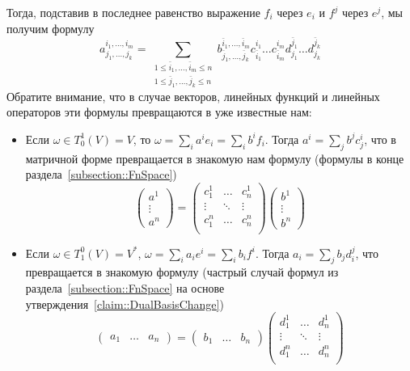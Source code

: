 Тогда, подставив в последнее равенство выражение $f_i$ через $e_i$ и $f^j$ через $e^j$, мы получим формулу
\[
a^{i_1,\ldots,i_m}_{j_1,\ldots,j_k} = \sum_{\substack{1\leqslant \bar i_1,\ldots,\bar i_m\leqslant n\\1\leqslant \bar j_1,\ldots,\bar j_k\leqslant n}} b^{\bar i_1,\ldots,\bar i_m}_{\bar j_1,\ldots,\bar j_k} c^{i_1}_{\bar i_1}\ldots c^{i_m}_{\bar i_m} d^{\bar j_1}_{j_1}\ldots d^{\bar j_k}_{j_k}
\]
Обратите внимание, что в случае векторов, линейных функций и линейных операторов эти формулы превращаются в уже известные нам:
\begin{itemize}

\item Если $\omega\in T^1_0(V) = V$, то $\omega = \sum_i a^i e_i = \sum_i b^i f_i$. Тогда $a^i = \sum_j b^j c^i_j$, что в матричной форме превращается в знакомую нам формулу (формулы в конце раздела~\ref{subsection::FnSpace})
\[
\begin{pmatrix}
{a^1}\\{\vdots}\\{a^n}
\end{pmatrix}
=
\begin{pmatrix}
{c^1_1}&{\ldots}&{c^1_n}\\
{\vdots}&{\ddots}&{\vdots}\\
{c^n_1}&{\ldots}&{c^n_n}\\
\end{pmatrix}
\begin{pmatrix}
{b^1}\\{\vdots}\\{b^n}
\end{pmatrix}
\]

\item Если $\omega\in T^0_1(V) = V^*$, $\omega = \sum_i a_i e^i = \sum_i b_i f^i$. Тогда $a_i = \sum_j b_j d^j_i$, что превращается в знакомую формулу (частрый случай формул из раздела~\ref{subsection::FnSpace} на основе утверждения~\ref{claim::DualBasisChange})
\[
\begin{pmatrix}
{a_1}&{\ldots}&{a_n}
\end{pmatrix}
=
\begin{pmatrix}
{b_1}&{\ldots}&{b_n}
\end{pmatrix}
\begin{pmatrix}
{d^1_1}&{\ldots}&{d^1_n}\\
{\vdots}&{\ddots}&{\vdots}\\
{d^n_1}&{\ldots}&{d^n_n}\\
\end{pmatrix}
\]


\end{itemize}
